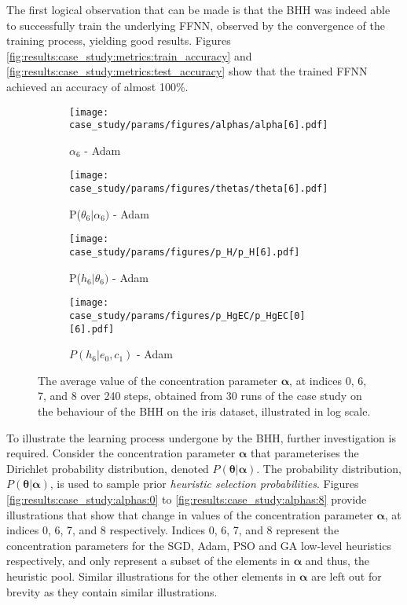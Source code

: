 The first logical observation that can be made is that the \acs{BHH} was indeed able to successfully train the underlying \acs{FFNN}, observed by the convergence of the training process, yielding good results. Figures \ref{fig:results:case_study:metrics:train_accuracy} and \ref{fig:results:case_study:metrics:test_accuracy} show that the trained \acs{FFNN} achieved an accuracy of almost 100\%.



\begin{figure}[htb]
	\begin{subfigure}{0.5\textwidth}
		\centering
		\texttt{[image: case\_study/params/figures/alphas/alpha[6].pdf]}
		\caption{$\alpha_{6}$ - \acs{Adam}}
		\label{fig:results:case_study:alphas:6}
	\end{subfigure}
	\begin{subfigure}{0.5\textwidth}
		\centering
		\texttt{[image: case\_study/params/figures/thetas/theta[6].pdf]}
		\caption{P($\theta_{6} \vert \alpha_{6})$ - \acs{Adam}}
		\label{fig:results:case_study:thetas:6}
	\end{subfigure}
	\par\bigskip
	\begin{subfigure}{0.5\textwidth}
		\centering
		\texttt{[image: case\_study/params/figures/p\_H/p\_H[6].pdf]}
		\caption{P($h_{6} \vert \theta_{6})$ - \acs{Adam}}
		\label{fig:results:case_study:p_H:6}
	\end{subfigure}
	\begin{subfigure}{0.5\textwidth}
		\centering
		\texttt{[image: case\_study/params/figures/p\_HgEC/p\_HgEC[0][6].pdf]}
		\caption{$P(h_{6} \vert e_{0}, c_{1})$ - \acs{Adam}}
		\label{fig:results:case_study:p_HgEC:0:6}
	\end{subfigure}
	\par\bigskip
	\caption{The average value of the concentration parameter $\boldsymbol{\alpha}$, at indices 0, 6, 7, and 8 over 240 steps, obtained from 30 runs of the case study on the behaviour of the \acs{BHH} on the iris dataset, illustrated in log scale.}
	\label{fig:results:case_study}
\end{figure}


To illustrate the learning process undergone by the \acs{BHH}, further investigation is required. Consider the concentration parameter $\boldsymbol{\alpha}$ that parameterises the Dirichlet probability distribution, denoted $P(\boldsymbol{\theta} \vert \boldsymbol{\alpha})$. The probability distribution, $P(\boldsymbol{\theta} \vert \boldsymbol{\alpha})$, is used to sample prior \textit{heuristic selection probabilities}. Figures \ref{fig:results:case_study:alphas:0} to \ref{fig:results:case_study:alphas:8} provide illustrations that show that change in values of the concentration parameter $\boldsymbol{\alpha}$, at indices 0, 6, 7, and 8 respectively. Indices 0, 6, 7, and 8 represent the concentration parameters for the \acs{SGD}, \acs{Adam}, \acs{PSO} and \acs{GA} low-level heuristics respectively, and only represent a subset of the elements in $\boldsymbol{\alpha}$ and thus, the heuristic pool. Similar illustrations for the other elements in $\boldsymbol{\alpha}$ are left out for brevity as they contain similar illustrations.

